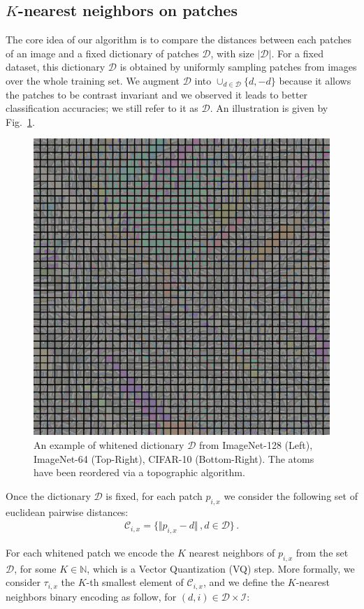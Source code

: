 \documentclass{article}
\begin{document}
{\subsection{$K$-nearest neighbors on patches}

The core idea of our algorithm is to compare the distances between each patches of an image and a fixed dictionary of patches $\mathcal{D}$, with size $|\mathcal{D}|$.
For a fixed dataset, this dictionary $\mathcal{D}$ is obtained by uniformly sampling patches from images over the whole training set. We augment $\mathcal{D}$ into $\cup_{d\in \mathcal{D}}\{d,-d\}$ because it allows the patches to be contrast invariant and we observed it leads to better classification accuracies; we still refer to it as $\mathcal{D}$. An illustration is given by Fig.~\ref{dico}.

\begin{figure}
  \centering
  	\includegraphics[width=0.5\linewidth]{figures/topographical_order_more_patches}
  \caption{An example of whitened dictionary  $\mathcal{D}$ from ImageNet-128 (Left), ImageNet-64 (Top-Right), CIFAR-10 (Bottom-Right). The atoms have been reordered via a topographic algorithm.\label{dico}}
\end{figure}

Once the dictionary $\mathcal{D}$ is fixed, for each patch $p_{i,x}$ we consider the following set of euclidean pairwise distances:
\begin{align*}\mathcal{C}_{i, x} =\{\Vert p_{i, x} - d \Vert\,, d\in\mathcal{D} \}\,.\end{align*}
 
For each whitened patch we encode the $K$ nearest neighbors of $p_{i,x}$ from the set $\mathcal{D}$, for some $ K \in \mathbb{N}$, which is a Vector Quantization (VQ) step.
More formally, we consider $\tau_{i,x}$ the $K$-th smallest  element of $\mathcal{C}_{i,x}$, and we define the $K$-nearest neighbors binary encoding as follow, for $(d,i)\in\mathcal{D}\times\mathcal{I}$:


}
\end{document}
